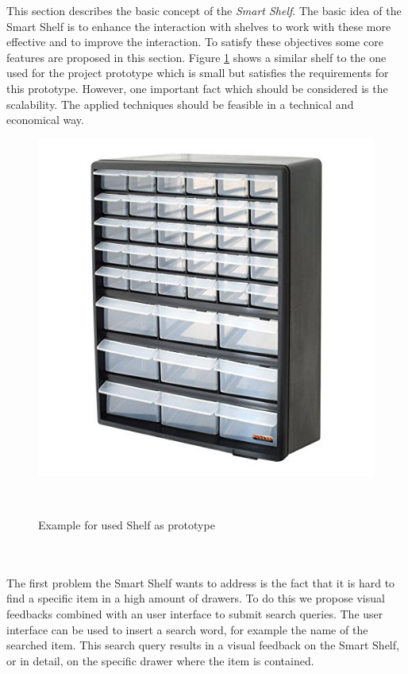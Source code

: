 This section describes the basic concept of the \textit{Smart Shelf}. 
The basic idea of the Smart Shelf is to enhance the interaction with shelves to work with these more effective and to improve the interaction. 
To satisfy these objectives some core features are proposed in this section. 
Figure \ref{fig:example_shelf} shows a similar shelf to the one used for the project prototype which is small but satisfies the requirements for this prototype. 
However, one important fact which should be considered is the scalability. 
The applied techniques should be feasible in a technical and economical way. 
%
\begin{figure}
	\includegraphics[width=0.9\columnwidth]{figures/example-prototype-shelf}
	\caption{Example for used Shelf as prototype}~\label{fig:example_shelf}
\end{figure}
%
\\
\\
The first problem the Smart Shelf wants to address is the fact that it is hard to find a specific item in a high amount of drawers. 
To do this we propose visual feedbacks combined with an user interface to submit search queries. 
The user interface can be used to insert a search word, for example the name of the searched item. 
This search query results in a visual feedback on the Smart Shelf, or in detail, on the specific drawer where the item is contained. 

